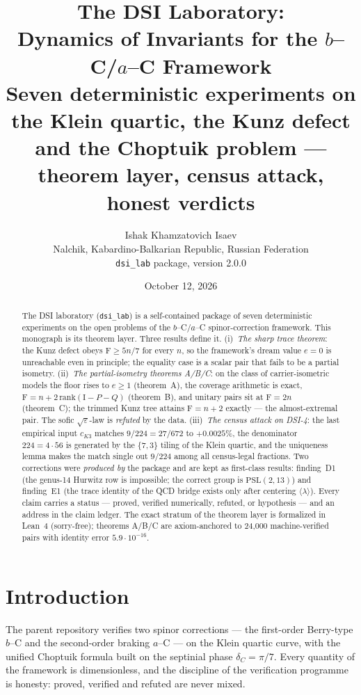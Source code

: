 \documentclass[11pt,a4paper]{article}
\title{\bf The DSI Laboratory:\\ Dynamics of Invariants for the $b$--C/$a$--C Framework\\
\large Seven deterministic experiments on the Klein quartic, the Kunz defect\\ and the Choptuik problem --- theorem layer, census attack, honest verdicts}
\author{Ishak Khamzatovich Isaev\\ \small Nalchik, Kabardino-Balkarian Republic, Russian Federation\\[-2pt]
\small \texttt{dsi\_lab} package, version 2.0.0}
\date{October 12, 2026}
\theoremstyle{definition}
\newcommand{\F}{\mathrm{F}}
\begin{document}
\maketitle

\begin{abstract}
\noindent
The DSI laboratory (\texttt{dsi\_lab}) is a self-contained package of
seven deterministic experiments on the open problems of the
$b$--C/$a$--C spinor-correction framework. This monograph is its
theorem layer. Three results define it. (i)~\emph{The sharp trace
theorem}: the Kunz defect obeys $\F \ge 5n/7$ for every $n$, so the
framework's dream value $e = 0$ is unreachable even in principle; the
equality case is a scalar pair that fails to be a partial isometry.
(ii)~\emph{The partial-isometry theorems A/B/C}: on the class of
carrier-isometric models the floor rises to $e \ge 1$ (theorem~A), the
coverage arithmetic is exact, $\F = n + 2\,\mathrm{rank}(\mathrm{I}-P-Q)$
(theorem~B), and unitary pairs sit at $\F = 2n$ (theorem~C); the trimmed
Kunz tree attains $\F = n+2$ exactly --- the almost-extremal pair. The
sofic $\sqrt{\varepsilon}$-law is \emph{refuted} by the data.
(iii)~\emph{The census attack on DSI-4}: the last empirical input
$c_{K3}$ matches $9/224 = 27/672$ to $+0.0025\%$, the denominator
$224 = 4\cdot 56$ is generated by the $\{7,3\}$ tiling of the Klein
quartic, and the uniqueness lemma makes the match single out $9/224$
among all census-legal fractions. Two corrections were \emph{produced
by} the package and are kept as first-class results: finding~D1 (the
genus-14 Hurwitz row is impossible; the correct group is
$\mathrm{PSL}(2,13)$) and finding~E1 (the trace identity of the QCD
bridge exists only after centering $\langle\lambda\rangle$). Every
claim carries a status --- proved, verified numerically, refuted, or
hypothesis --- and an address in the claim ledger. The exact stratum of
the theorem layer is formalized in Lean~4 (sorry-free); theorems
A/B/C are axiom-anchored to 24{,}000 machine-verified pairs with
identity error $5.9\cdot 10^{-16}$.
\end{abstract}

\tableofcontents

\section{Introduction}\label{sec:intro}

The parent repository verifies two spinor corrections --- the
first-order Berry-type $b$--C and the second-order braking $a$--C --- on
the Klein quartic curve, with the unified Choptuik formula built on the
septinial phase $\delta_C = \pi/7$. Every quantity of the framework is
dimensionless, and the discipline of the verification programme is
honesty: proved, verified and refuted are never mixed.
\end{document}
